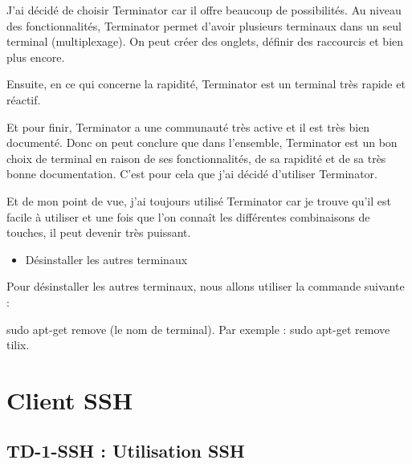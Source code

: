 \documentclass[12pt]{article}
\begin{document}
\vspace{0.3cm}

J'ai décidé de choisir Terminator car il offre beaucoup de possibilités. Au niveau des fonctionnalités, Terminator permet d'avoir plusieurs terminaux dans un seul terminal (multiplexage). On peut créer des onglets, définir des raccourcis et bien plus encore.

\vspace{0.3cm}

Ensuite, en ce qui concerne la rapidité, Terminator est un terminal très rapide et réactif.

\vspace{0.3cm}

Et pour finir, Terminator a une communauté très active et il est très bien documenté. Donc on peut conclure que dans l'ensemble, Terminator est un bon choix de terminal en raison de ses fonctionnalités, de sa rapidité et de sa très bonne documentation. C'est pour cela que j'ai décidé d'utiliser Terminator.

\vspace{0.3cm}

Et de mon point de vue, j'ai toujours utilisé Terminator car je trouve qu'il est facile à utiliser et une fois que l'on connaît les différentes combinaisons de touches, il peut devenir très puissant.

\vspace{0.3cm}

\begin{itemize}
  \item Désinstaller les autres terminaux
\end{itemize}

\vspace{0.3cm}

Pour désinstaller les autres terminaux, nous allons utiliser la commande suivante : 

\vspace{0.3cm}

sudo apt-get remove (le nom de terminal). Par exemple : sudo apt-get remove tilix.




\newpage

\section{Client SSH}

  \subsection{TD-1-SSH : Utilisation SSH}
\end{document}

